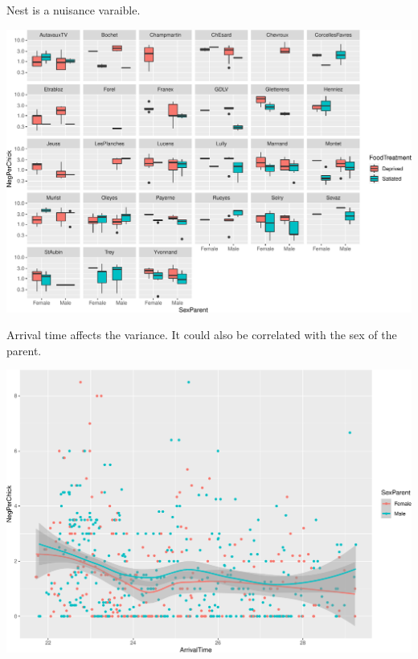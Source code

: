 \documentclass[
  ignorenonframetext,
]{beamer}
\begin{document}
\begin{frame}{Nest is a nuisance varaible.}
\protect\hypertarget{nest-is-a-nuisance-varaible.}{}
\scriptsize

\includegraphics{mixed_models_files/figure-beamer/unnamed-chunk-6-1.pdf}
\end{frame}

\begin{frame}{Arrival time affects the variance.}
\protect\hypertarget{arrival-time-affects-the-variance.}{}
It could also be correlated with the sex of the parent.

\scriptsize

\includegraphics{mixed_models_files/figure-beamer/unnamed-chunk-7-1.pdf}
\end{frame}
\end{document}
